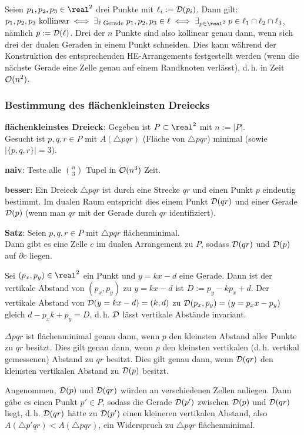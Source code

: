 Seien $p_1, p_2, p_3 \in \real^2$ drei Punkte mit $\ell_i := \mathcal{D}(p_i)$.
Dann gilt:\\
$p_1, p_2, p_3 \text{ kollinear} \iff
\exists_{\ell \text{ Gerade}}\; p_1, p_2, p_3 \in \ell \iff
\exists_{p \in \real^2}\; p \in \ell_1 \cap \ell_2 \cap \ell_3$,
nämlich $p := \mathcal{D}(\ell)$.
Drei der $n$ Punkte sind also kollinear genau dann, wenn sich drei der dualen Geraden in einem
Punkt schneiden.
Dies kann während der Konstruktion des entsprechenden HE-Arrangements festgestellt werden
(wenn die nächste Gerade eine Zelle genau auf einem Randknoten verlässt),
d.\,h. in Zeit $\mathcal{O}(n^2)$.

\pagebreak

\subsubsection{%
    Bestimmung des flächenkleinsten Dreiecks%
}

\textbf{flächenkleinstes Dreieck}:
Gegeben ist $P \subset \real^2$ mit $n := |P|$.\\
Gesucht ist $p, q, r \in P$ mit $A(\triangle pqr)$ (Fläche von $\triangle pqr$) minimal
(sowie $|\{p, q, r\}| = 3$).

\textbf{naiv}:
Teste alle $\binom{n}{3}$ Tupel in $\mathcal{O}(n^3)$ Zeit.

\linie

\textbf{besser}:
Ein Dreieck $\triangle pqr$ ist durch eine Strecke $qr$ und einen Punkt $p$ eindeutig bestimmt.
Im dualen Raum entspricht dies einem Punkt $\mathcal{D}(qr)$ und einer Gerade $\mathcal{D}(p)$
(wenn man $qr$ mit der Gerade durch $qr$ identifiziert).

\textbf{Satz}:
Seien $p, q, r \in P$ mit $\triangle pqr$ flächenminimal.\\
Dann gibt es eine Zelle $c$ im dualen Arrangement zu $P$, sodass
$\mathcal{D}(qr)$ und $\mathcal{D}(p)$ auf $\partial c$ liegen.

\begin{Beweis}
    Sei $(p_x, p_y) \in \real^2$ ein Punkt und $y = kx - d$ eine Gerade.
    Dann ist der vertikale Abstand von $(p_x, p_y)$ zu $y = kx - d$ ist $D := p_y - kp_x + d$.
    Der vertikale Abstand von $\mathcal{D}(y = kx - d) = (k, d)$ zu $\mathcal{D}(p_x, p_y) = (y = p_x x - p_y)$
    gleich $d - p_x k + p_y = D$, d.\,h. $\mathcal{D}$ lässt vertikale Abstände invariant.

    $\Delta pqr$ ist flächenminimal genau dann, wenn $p$ den kleinsten Abstand aller Punkte zu
    $qr$ besitzt.
    Dies gilt genau dann, wenn $p$ den kleinsten vertikalen (d.\,h. vertikal gemessenen) Abstand
    zu $qr$ besitzt.
    Dies gilt genau dann, wenn $\mathcal{D}(qr)$ den kleinsten vertikalen Abstand zu $\mathcal{D}(p)$ besitzt.

    Angenommen, $\mathcal{D}(p)$ und $\mathcal{D}(qr)$ würden an verschiedenen Zellen anliegen.
    Dann gäbe es einen Punkt $p' \in P$, sodass die Gerade $\mathcal{D}(p')$ zwischen $\mathcal{D}(p)$ und $\mathcal{D}(qr)$
    liegt, d.\,h. $\mathcal{D}(qr)$ hätte zu $\mathcal{D}(p')$ einen kleineren vertikalen Abstand,
    also $A(\triangle p'qr) < A(\triangle pqr)$, ein Widerspruch zu $\triangle pqr$ flächenminimal.
\end{Beweis}

